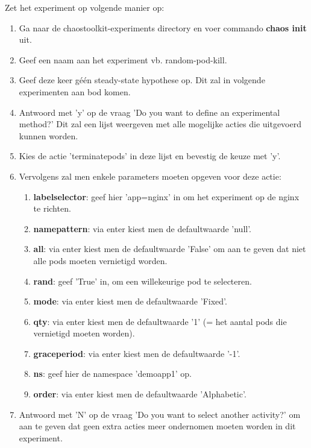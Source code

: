 Zet het experiment op volgende manier op:  
\begin{enumerate}
    \item Ga naar de chaostoolkit-experiments directory en voer commando {\bf chaos init} uit.
    \item Geef een naam aan het experiment vb. random-pod-kill.
    \item Geef deze keer géén steady-state hypothese op. Dit zal in volgende experimenten aan bod komen.
    \item Antwoord met 'y' op de vraag 'Do you want to define an experimental method?' Dit zal een lijst weergeven met alle mogelijke acties die uitgevoerd kunnen worden. 
    \item Kies de actie 'terminate\textunderscore pods' in deze lijst en bevestig de keuze met 'y'. 
    \item Vervolgens zal men enkele parameters moeten opgeven voor deze actie: 
    \begin{enumerate}
        \item {\bf label\textunderscore selector}: geef hier 'app=nginx' in om het experiment op de nginx te richten.
        \item {\bf name\textunderscore pattern}: via enter kiest men de defaultwaarde 'null'.
        \item {\bf all}: via enter kiest men de defaultwaarde 'False' om aan te geven dat niet alle pods moeten vernietigd worden.
        \item {\bf rand}: geef 'True' in, om een willekeurige pod te selecteren.
        \item {\bf mode}: via enter kiest men de defaultwaarde 'Fixed'.
        \item {\bf qty}: via enter kiest men de defaultwaarde '1' (= het aantal pods die vernietigd moeten worden).
        \item {\bf grace\textunderscore period}: via enter kiest men de defaultwaarde '-1'.
        \item {\bf ns}: geef hier de namespace 'demoapp1' op.
        \item {\bf order}: via enter kiest men de defaultwaarde 'Alphabetic'.
    \end{enumerate}
    \item Antwoord met 'N' op de vraag 'Do you want to select another activity?' om aan te geven dat geen extra acties meer ondernomen moeten worden in dit experiment.
\end{enumerate} 

